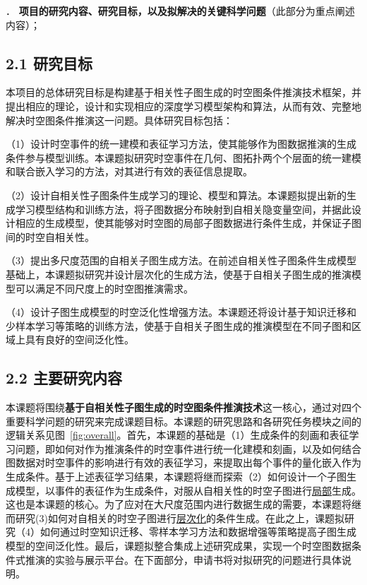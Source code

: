 \documentclass[12pt,UTF8,AutoFakeBold=2,a4paper]{ctexart} %
\newcommand{\sihao}{\fontsize{14pt}{\baselineskip}\selectfont}
\begin{document}
\fi

{\footnotesize

}

\newpage
{\sihao \color{MsBlue} ． {\bfseries 项目的研究内容、研究目标，以及拟解决的关键科学问题}（此部分为重点阐述内容）；}
\subsection{2.1 研究目标} 本项目的总体研究目标是构建基于相关性子图生成的时空图条件推演技术框架，并提出相应的理论，设计和实现相应的深度学习模型架构和算法，从而有效、完整地解决时空图条件推演这一问题。具体研究目标包括：

（1）设计时空事件的统一建模和表征学习方法，使其能够作为图数据推演的生成条件参与模型训练。本课题拟研究时空事件在几何、图拓扑两个个层面的统一建模和联合嵌入学习的方法，对其进行有效的表征信息提取。%

（2）设计自相关性子图条件生成学习的理论、模型和算法。本课题拟提出新的生成学习模型结构和训练方法，将子图数据分布映射到自相关隐变量空间，并据此设计相应的生成模型，使其能够对时空图的局部子图数据进行条件生成，并保证子图间的时空自相关性。

（3）提出多尺度范围的自相关子图生成方法。在前述自相关性子图条件生成模型基础上，本课题拟研究并设计层次化的生成方法，使基于自相关子图生成的推演模型可以满足不同尺度上的时空图推演需求。

（4）设计子图生成模型的时空泛化性增强方法。本课题还将设计基于知识迁移和少样本学习等策略的训练方法，使基于自相关子图生成的推演模型在不同子图和区域上具有良好的空间泛化性。


\subsection{2.2 主要研究内容}

本课题将围绕\textbf{基于自相关性子图生成的时空图条件推演技术}这一核心，通过对四个重要科学问题的研究来完成课题目标。本课题的研究思路和各研究任务模块之间的逻辑关系见图~\ref{fig:overall}。首先，本课题的基础是（1）生成条件的刻画和表征学习问题，即如何对作为推演条件的时空事件进行统一化建模和刻画，以及如何结合图数据对时空事件的影响进行有效的表征学习，来提取出每个事件的量化嵌入作为生成条件。基于上述表征学习结果，本课题将继而探索（2）如何设计一个子图生成模型，以事件的表征作为生成条件，对服从自相关性的时空子图进行\underline{局部}生成。这也是本课题的核心。为了应对在大尺度范围内进行数据生成的需要，本课题将继而研究(3)如何对自相关的时空子图进行\underline{层次化}的条件生成。在此之上，课题拟研究（4）如何通过时空知识迁移、零样本学习方法和数据增强等策略提高子图生成模型的空间泛化性。最后，课题拟整合集成上述研究成果，实现一个时空图数据条件式推演的实验与展示平台。在下面部分，申请书将对拟研究的问题进行具体说明。
\end{document}
